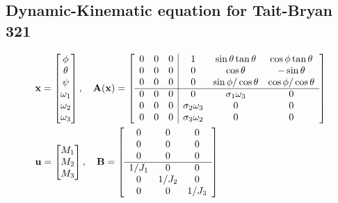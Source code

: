 \subsection{Dynamic-Kinematic equation for Tait-Bryan 321}
\begin{equation}
    \begin{aligned}
        &\mathbf{x}=\begin{bmatrix}
            \phi\\\theta\\\psi\\\omega_1\\\omega_2\\\omega_3
        \end{bmatrix}, \quad
        \mathbf{A(x)}=
        \left[
        \begin{array}{c|c}
            \begin{matrix}
                0&0&0\\0&0&0\\0&0&0\\
                \hline
                0&0&0\\0&0&0\\0&0&0
            \end{matrix}
            &
            \begin{matrix}
                1&\sin\theta\tan\theta&\cos\phi\tan\theta\\
                0&\cos\theta&-\sin\theta\\
                0&\sin\phi/\cos\theta&\cos\phi/\cos\theta\\
                \hline
                0&\sigma_1\omega_3&0\\
                \sigma_2\omega_3&0&0\\
                \sigma_3\omega_2&0&0
            \end{matrix} 
        \end{array}
        \right]\\\vspace{1cm}
        &\mathbf{u}=\begin{bmatrix}
            M_1\\M_2\\M_3
        \end{bmatrix}, \quad
        \mathbf{B}=
            \left[
                \begin{array}{c}
                    \begin{matrix}
                        0&0&0\\0&0&0\\0&0&0\\
                    \hline
                        1/J_1&0&0\\0&1/J_2&0\\0&0&1/J_3
                    \end{matrix}
                \end{array}
            \right]
    \end{aligned}
\end{equation}

